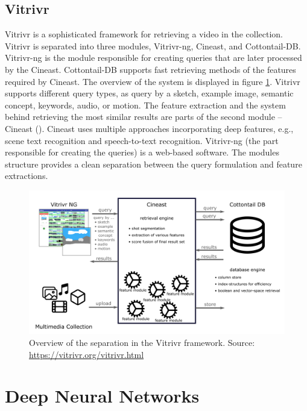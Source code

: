 \subsection{Vitrivr}

Vitrivr \citep{rossetto2016vitrivr} is a sophisticated framework for retrieving a video in the collection. Vitrivr is separated into three modules, Vitrivr-ng, Cineast, and Cottontail-DB.  Vitrivr-ng is the module responsible for creating queries that are later processed by the Cineast. Cottontail-DB supports fast retrieving methods of the features required by Cineast. The overview of the system is displayed in figure \ref{fig:vitrivr}. Vitrivr supports different query types, as query by a sketch, example image, semantic concept, keywords, audio, or motion. The feature extraction and the system behind retrieving the most similar results are parts of the second module -- Cineast (\cite{rossetto2016searching}). Cineast uses multiple approaches incorporating deep features, e.g., scene text recognition and speech-to-text recognition. Vitrivr-ng (the part responsible for creating the queries) is a web-based software. The modules structure provides a clean separation between the query formulation and feature extractions.

\begin{figure}
    \centering
    \includegraphics[width=\linewidth]{img/vitrivr.png}
    \caption{Overview of the separation in the Vitrivr framework. Source: \url{https://vitrivr.org/vitrivr.html}}
    \label{fig:vitrivr}
\end{figure}

\section{Deep Neural Networks}

